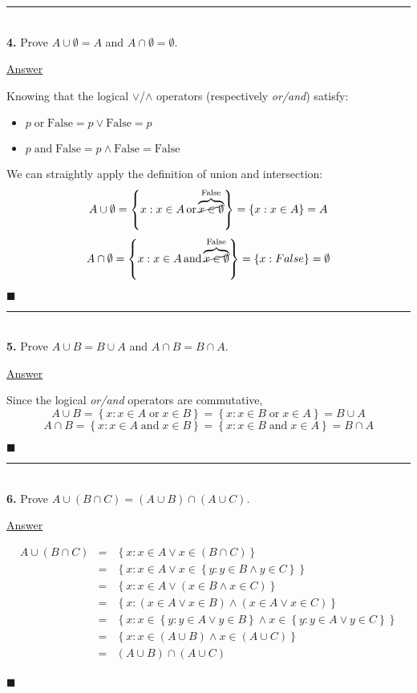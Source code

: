 \documentclass{article}[10pt]
\newenvironment{exercise}[1]
    {\noindent\rule{2cm}{0.4pt} \\
     \textbf{#1.}}
    {}
\newcommand{\answer}{

  \underline{Answer}

}
\newcommand{\qed}{

\hfill\ensuremath{\blacksquare}

}
\begin{document}
\begin{exercise}{4}
  Prove $A \cup \emptyset = A$ and $A \cap \emptyset = \emptyset$.
  \answer
  Knowing that the logical $\lor$/$\land$ operators
  (respectively \emph{or/and}) satisfy:
  \begin{itemize}
    \item $p \operatorname{or} \text{False} = p \lor \text{False} = p$
    \item $p \operatorname{and} \text{False} = p \land \text{False}
                                             = \text{False}$
  \end{itemize}

  We can straightly apply the definition of union and intersection:
  \[
    A \cup \emptyset
    = \left\{ x : x \in A \operatorname{or}
                  \overbrace{\cancel{x \in \emptyset}}^{\text{False}}
      \right\}
    = \left\{ x : x \in A \right\}
    = A
  \]
  \[
    A \cap \emptyset
    = \left\{ x : x \in A \operatorname{and}
                  \overbrace{\cancel{x \in \emptyset}}^{\text{False}}
      \right\}
    = \left\{ x : False\right\}
    = \emptyset
  \]
  \qed
\end{exercise}


\begin{exercise}{5}
  Prove $A \cup B = B \cup A$ and $A \cap B = B \cap A$.
  \answer
  Since the logical \emph{or/and} operators are commutative,
  \[
    A \cup B
    = \left\{ x : x \in A \operatorname{or} x \in B\right\}
    = \left\{ x : x \in B \operatorname{or} x \in A\right\}
    = B \cup A
  \]
  \[
    A \cap B
    = \left\{ x : x \in A \operatorname{and} x \in B\right\}
    = \left\{ x : x \in B \operatorname{and} x \in A\right\}
    = B \cap A
  \]
  \qed
\end{exercise}


\begin{exercise}{6}
  Prove $A \cup (B \cap C) = (A \cup B) \cap (A \cup C)$.
  \answer
  \[\begin{array}{rcl}
    A \cup (B \cap C)
    &=& \left\{ x : x \in A \lor x \in (B \cap C) \right\} \\
    &=& \left\{ x : x \in A \lor
                    x \in \left\{ y : y \in B \land y \in C \right\}
        \right\} \\
    &=& \left\{ x : x \in A \lor
                    \left( x \in B \land x \in C \right)
        \right\} \\
    &=& \left\{ x : \left( x \in A \lor x \in B \right) \land
                    \left( x \in A \lor x \in C \right)
        \right\} \\
    &=& \left\{ x : x \in \left\{ y : y \in A \lor y \in B \right\}
                    \land
                    x \in \left\{ y : y \in A \lor y \in C \right\}
        \right\} \\
    &=& \left\{ x : x \in (A \cup B) \land x \in(A \cup C) \right\} \\
    &=& (A \cup B) \cap (A \cup C) \\
  \end{array}\]
  \qed
\end{exercise}
\end{document}
